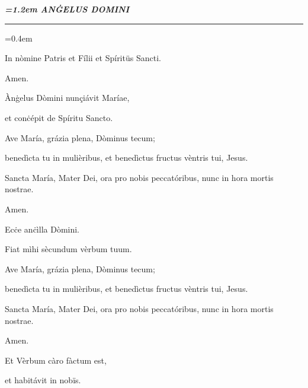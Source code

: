 \documentclass[twoside,10pt]{article}
\begin{document}
\pagestyle{empty}
{
  \begin{center}
  {\bfseries\itshape\large{}\font=1.2em \uppercase{anġelus domini}}
  \end{center}
}

{
  \begin{center}
  \rule{20em}{0.4pt}
  \end{center}
}

{
  \setlength\parindent{2em}\font=0.4em

  \bigskip

  \noindent In nòmine Patris et Fílii et Spíritüs Sancti.
  
  Amen.

  \bigskip

   Ànġelus Dòmini nunçiávit Maríae,

  \smallskip

   et conċépit de Spíritu Sancto.

  \bigskip

  \noindent Ave María, grázia plena, Dòminus tecum;
  
  benedìcta tu in mulièribus, et benedìctus fructus vèntris tui, Jesus.

  Sancta María, Mater Dei, ora pro nobis peccatóribus, nunc in hora mortis nostrae.

  Amen.

  \bigskip

   Ecċe anċìlla Dòmini.

  \smallskip

   Fiat mìhi sècundum vèrbum tuum.

  \bigskip

  \noindent Ave María, grázia plena, Dòminus tecum;
  
  benedìcta tu in mulièribus, et benedìctus fructus vèntris tui, Jesus.

  Sancta María, Mater Dei, ora pro nobis peccatóribus, nunc in hora mortis nostrae.

  Amen.

  \bigskip

   Et Vèrbum càro fàctum est,

  \smallskip

   et habitávit in nobïs.

  \bigskip

}
\end{document}
